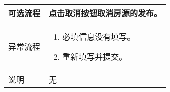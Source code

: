\begin{table}[htbp]
\begin{tabular}{|l|l|l|l|}
        可选流程                          & \multicolumn{3}{l|}{点击取消按钮取消房源的发布。 }                                                                                                                          \\
        \hline
        异常流程                          & \multicolumn{3}{l|}{
            \begin{minipage}[t]{0.8\textwidth}
                \begin{enumerate}
                    \item 必填信息没有填写。
                    \item 重新填写并提交。
                \end{enumerate}
                \vspace{.5em}
            \end{minipage}
        }                                                                                                                                                                                                               \\
        \hline
        说明                              & \multicolumn{3}{l|}{
        \begin{minipage}[t]{0.8\textwidth}
                无
                \vspace{.5em}
            \end{minipage} }                                                                                                                                                                                    \\
        \hline
    \end{tabular}
\end{table}

